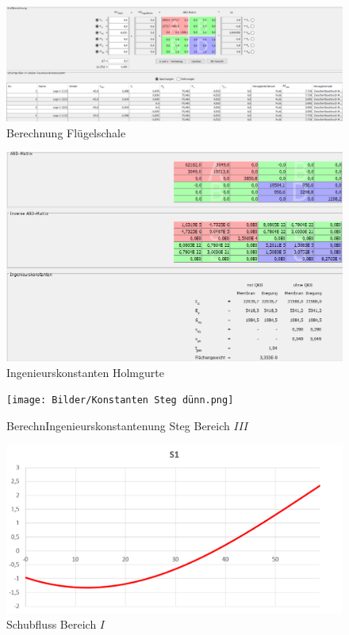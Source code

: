 \begin{figure}
	\includegraphics[width=1.0\textwidth]{Bilder/Berechnung Haut.png}
	\caption{Berechnung Flügelschale}
	\label{fig:Berechnung Haut}
\end{figure}
\begin{figure}
	\includegraphics[width=1.0\textwidth]{Bilder/Konstanten Holmgurte.png}
	\caption{Ingenieurskonstanten Holmgurte}
	\label{fig:Ingenieurskonstanten Holmgurte}
\end{figure}
\begin{figure}
	\texttt{[image: Bilder/Konstanten Steg dünn.png]}
	\caption{BerechnIngenieurskonstantenung Steg Bereich $III$}
	\label{fig:Ingenieurskonstanten Steg dünn}
\end{figure}
\begin{figure}
	\includegraphics[width=1.0\textwidth]{Bilder/S1.png}
	\caption{Schubfluss Bereich $I$}
	\label{fig:S1}
\end{figure}
